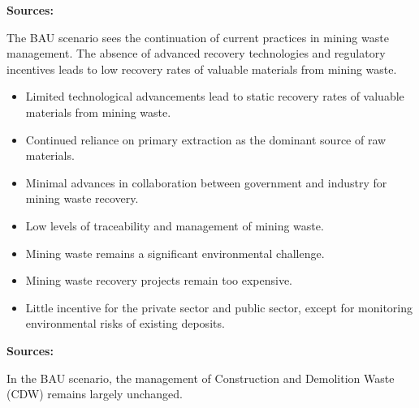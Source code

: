 \wasteSubsubsecMIN
\textbf{Sources:}

The BAU scenario sees the continuation of current practices in mining waste management. The absence of advanced recovery technologies and regulatory incentives leads to low recovery rates of valuable materials from mining waste.

\begin{itemize}
  \item Limited technological advancements lead to static recovery rates of valuable materials from mining waste.
  \item Continued reliance on primary extraction as the dominant source of raw materials.
  \item Minimal advances in collaboration between government and industry for mining waste recovery.
  \item Low levels of traceability and management of mining waste.
  \item Mining waste remains a significant environmental challenge.
  \item Mining waste recovery projects remain too expensive.
  \item Little incentive for the private sector and public sector, except for monitoring environmental risks of existing deposits.
\end{itemize}



\wasteSubsubsecCDW
\textbf{Sources:}~\cite{eu2008wastedirective}

In the BAU scenario, the management of Construction and Demolition Waste (CDW) remains largely unchanged.

